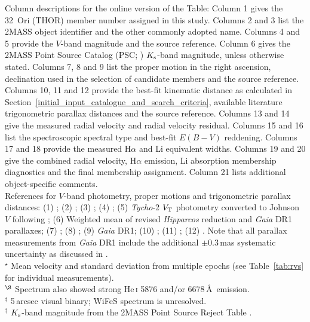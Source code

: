 \documentclass[usenatbib]{mnras}
\begin{document}
\begin{landscape}
\begin{table}
\begin{tabular}{r l c c c c c c c c c c c c c c c c c}
\hline
\end{tabular}
\begin{flushleft}
%
  Column descriptions for the online version of the Table:
  Column 1 gives the 32~Ori (THOR) member number assigned in this study.
  Columns 2 and 3 list the 2MASS object identifier and the other commonly adopted name.
  Columns 4 and 5 provide the $V$-band magnitude and the source reference.
  Column 6 gives the 2MASS Point Source Catalog (PSC; \protect\citealp{Cutri03})
  $K_{\rm{s}}$-band magnitude, unless otherwise stated.
  Columns 7, 8 and 9 list the proper motion in the right ascension, declination
  used in the selection of candidate members and the source reference.
  Columns 10, 11 and 12 provide the best-fit kinematic distance as calculated in
  Section~\ref{initial_input_catalogue_and_search_criteria}, available literature
  trigonometric parallax distances and the source reference.
  Columns 13 and 14 give the measured radial velocity and radial velocity
  residual.
  Columns 15 and 16 list the spectroscopic spectral type and best-fit $E(B-V)$ reddening.
  Columns 17 and 18 provide the measured H$\alpha$ and Li equivalent widths.
  Columns 19 and 20 give the combined radial velocity, H$\alpha$ emission,
  Li absorption membership diagnostics and the final membership assignment.
  Column 21 lists additional object-specific comments.
  \\
%
References for $V$-band photometry, proper motions
and trigonometric parallax distances:
(1) \cite{Mermilliod06}; (2) \cite{Zacharias13}; (3) \cite{vanLeeuwen07};
(4) \cite{Hauck98}; (5) \emph{Tycho}-2 $V_{\rm{T}}$ photometry converted to Johnson
$V$ following \cite*{Mamajek06}; (6) Weighted mean of revised \emph{Hipparcos}
reduction \citep{vanLeeuwen07} and \emph{Gaia} DR1 \citep{Gaia16} parallaxes;
(7) \cite{Henden16}; (8) \cite{Zacharias15}; (9) \emph{Gaia} DR1;
(10) \cite{Zacharias05}; (11) \cite{Dolan02}; (12) \cite{Burgasser16}.
Note that all parallax measurements from \emph{Gaia} DR1 include the additional
$\pm0.3$\,mas systematic uncertainty as discussed in \cite{Gaia16}.
\\
%
$^{\star}$ Mean velocity and standard deviation from multiple epochs (see Table~\ref{tab:rvs} for individual measurements).\\
%
$^{\S}$ Spectrum also showed strong He\,\textsc{i} 5876 and/or 6678\,\AA\ emission. \\
%
$^{\ddag}$ 5\,arcsec visual binary; WiFeS spectrum is unresolved.\\
%
$^{\dagger}$ $K_{\rm{s}}$-band magnitude from the 2MASS Point Source Reject Table \citep[see also \citealp{Burgasser16}]{Cutri03}.
\end{flushleft}
\label{tab:candidate_spectra}
\end{table}
\end{landscape}
\end{document}
